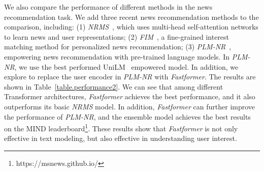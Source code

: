 \documentclass[11pt,a4paper]{article}
\begin{document}
We also compare the performance of different methods in the news recommendation task. 
We add three recent news recommendation methods to the comparison, including: (1) \textit{NRMS}~\cite{wu2019nrms}, which uses multi-head self-attention networks to learn news and user representations; (2) \textit{FIM}~\cite{wang2020fine}, a fine-grained interest matching method for personalized news recommendation; (3) \textit{PLM-NR}~\cite{wu2021plm}, empowering news recommendation with pre-trained language models. In \textit{PLM-NR}, we use the best performed UniLM~\cite{bao2020unilmv2} empowered model.
In addition, we explore to replace the user encoder in \textit{PLM-NR} with \textit{Fastformer}.
The results are shown in Table~\ref{table.performance2}.
We can see that among different Transformer architectures, \textit{Fastformer} achieves the best performance, and it also outperforms its basic \textit{NRMS} model.
In addition, \textit{Fastformer} can further improve the performance of \textit{PLM-NR}, and the ensemble model achieves the best results on the MIND leaderboard\footnote{https://msnews.github.io/}.
These results show that \textit{Fastformer} is not only effective in text modeling, but also effective in understanding user interest.
\end{document}
